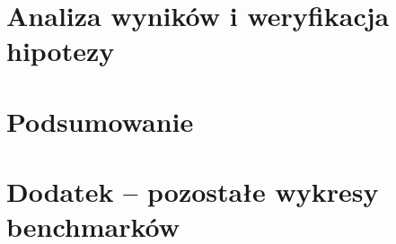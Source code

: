 \documentclass{template}
\begin{document}
\section{Analiza wyników i weryfikacja hipotezy}

\section{Podsumowanie}

\appendix
\section{Dodatek -- pozostałe wykresy benchmarków}

\end{document}
